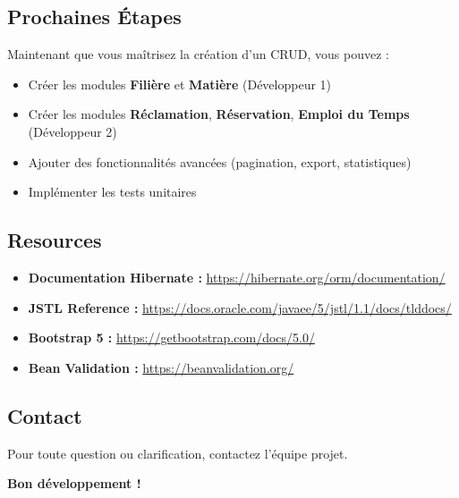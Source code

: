 \documentclass[12pt,a4paper]{article}
\begin{document}
\subsection{Prochaines Étapes}

Maintenant que vous maîtrisez la création d'un CRUD, vous pouvez :
\begin{itemize}
    \item Créer les modules \textbf{Filière} et \textbf{Matière} (Développeur 1)
    \item Créer les modules \textbf{Réclamation}, \textbf{Réservation}, \textbf{Emploi du Temps} (Développeur 2)
    \item Ajouter des fonctionnalités avancées (pagination, export, statistiques)
    \item Implémenter les tests unitaires
\end{itemize}

\subsection{Resources}

\begin{itemize}
    \item \textbf{Documentation Hibernate :} \url{https://hibernate.org/orm/documentation/}
    \item \textbf{JSTL Reference :} \url{https://docs.oracle.com/javaee/5/jstl/1.1/docs/tlddocs/}
    \item \textbf{Bootstrap 5 :} \url{https://getbootstrap.com/docs/5.0/}
    \item \textbf{Bean Validation :} \url{https://beanvalidation.org/}
\end{itemize}

\subsection{Contact}

Pour toute question ou clarification, contactez l'équipe projet.

\vspace{1cm}

\begin{center}
\textbf{Bon développement ! 🚀}
\end{center}
\end{document}

